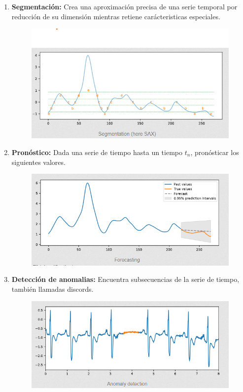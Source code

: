 \documentclass[a4paper, 11pt]{article}
\begin{document}
\begin{enumerate}
\begin{figure}[H]
        \label{Fig. 3}
    \end{figure} 
    \item \textbf{Segmentación: } Crea una aproximación precisa de una serie temporal por reducción de su dimensión mientras retiene carácteristicas especiales.
    \begin{figure}[H] 
        \centering 
        \includegraphics[width = 10 cm ]{Figures/T5.png} 
        \label{Fig. 4}
    \end{figure} 
    \item \textbf{Pronóstico: } Dada una serie de tiempo hasta un tiempo $t_n$, pronósticar los siguientes valores.
    \begin{figure}[H] 
        \centering 
        \includegraphics[width = 10 cm]{Figures/T1.png} 
        \label{Fig. 5 }
    \end{figure} 
    \item \textbf{Detección de anomalias: } Encuentra subsecuencias de la serie de tiempo, también llamadas discords.
    \begin{figure}[H] 
        \centering 
        \includegraphics[width =10 cm ]{Figures/T4.png} 

\end{figure}
\end{enumerate}
\end{document}
